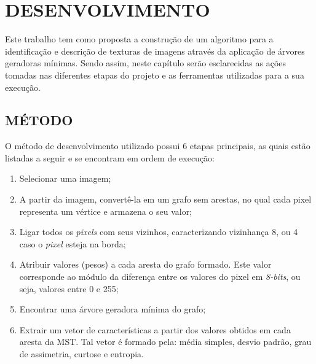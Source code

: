 
\chapter{DESENVOLVIMENTO}
\label{chap:proposta}

\par Este trabalho tem como proposta a construção de um algoritmo para a identificação e descrição de texturas de imagens através da aplicação de árvores geradoras mínimas. Sendo assim, neste capítulo serão esclarecidas as ações tomadas nas diferentes etapas do projeto e as ferramentas utilizadas para a sua execução.

\section{MÉTODO}
\label{sec:metodo}

\par O método de desenvolvimento utilizado possui 6 etapas principais, as quais estão listadas a seguir e se encontram em ordem de execução:

\begin{enumerate}
    \item Selecionar uma imagem;
    \item A partir da imagem, convertê-la em um grafo sem arestas, no qual cada pixel representa um vértice e armazena o seu valor;
    \item Ligar todos os \textit{pixels} com seus vizinhos, caracterizando vizinhança 8, ou 4 caso o \textit{pixel} esteja na borda;
    \item Atribuir valores (pesos) a cada aresta do grafo formado. Este valor corresponde ao módulo da diferença entre os valores do pixel em \textit{8-bits}, ou seja, valores entre 0 e 255;
    \item Encontrar uma árvore geradora mínima do grafo;
    \item Extrair um vetor de características a partir dos valores obtidos em cada aresta da MST. Tal vetor é formado pela: média simples, desvio padrão, grau de assimetria, curtose e entropia.
\end{enumerate}

